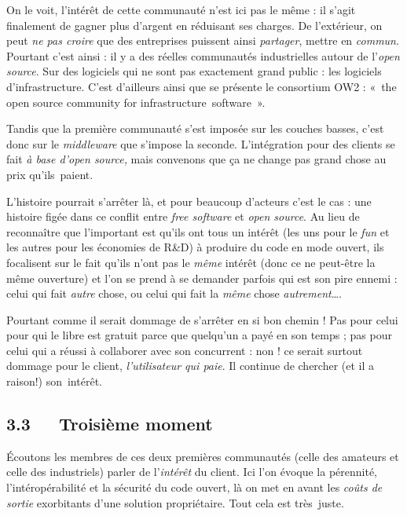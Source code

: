 \documentclass{FramateX}
\begin{document}
\begin{refsection}
On le voit, l'intérêt de cette communauté n'est ici pas le même : il
s'agit finalement de gagner plus d'argent en réduisant ses charges. De
l'extérieur, on peut \textit{ne pas croire} que des entreprises
puissent ainsi \textit{partager}, mettre en \textit{commun}. Pourtant
c'est ainsi : il y a des réelles communautés industrielles autour de
l'\textit{open source}. Sur des logiciels qui ne sont pas exactement
grand public : les logiciels d'infrastructure. C'est d'ailleurs ainsi
que se présente le consortium OW2 : «~the open source community for
infrastructure~software~».

Tandis que la première communauté s'est imposée sur les couches basses,
c'est donc sur le \textit{middleware} que s'impose la seconde.
L'intégration pour des clients se fait \textit{à base d'open source,}
mais convenons que ça ne change pas grand chose au prix qu'ils~paient.

L'histoire pourrait s'arrêter là, et pour beaucoup d'acteurs c'est le
cas : une histoire figée dans ce conflit entre \textit{free software}
et \textit{open source}. Au lieu de reconnaître que l'important est
qu'ils ont tous un intérêt (les uns pour le \textit{fun }et les autres
pour les économies de R\&D) à produire du code en mode ouvert, ils
focalisent sur le fait qu'ils n'ont pas le \textit{même} intérêt (donc
ce ne peut-être la même ouverture) et l'on se prend à se demander
parfois qui est son pire ennemi : celui qui fait \textit{autre} chose,
ou celui qui fait la \textit{même} chose \textit{autrement}…. 

Pourtant comme il serait dommage de s'arrêter en si bon chemin ! Pas
pour celui pour qui le libre est gratuit parce que quelqu'un a payé en
son temps ; pas pour celui qui a réussi à collaborer avec son
concurrent : non ! ce serait surtout dommage pour le client,
\textit{l'utilisateur qui paie}. Il continue de chercher (et il a
raison!) son~intérêt.


\bigskip

\subsection*{3.3~~~Troisième moment}
{}

Écoutons les membres de ces deux premières communautés (celle des
amateurs et celle des industriels) parler de l'\textit{intérêt }du
client. Ici l'on évoque la pérennité, l'intéropérabilité et la sécurité
du code ouvert, là on met en avant les \textit{coûts de sortie}
exorbitants d'une solution propriétaire. Tout cela est très~juste.


\end{refsection}
\end{document}
